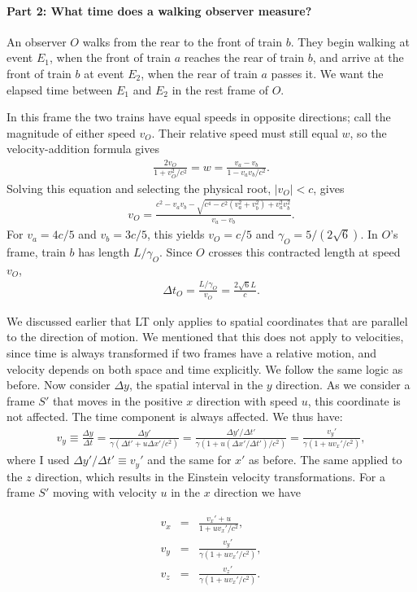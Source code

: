 \documentclass[12pt]{article}
\newcommand{\be}{\begin{eqnarray}}
\newcommand{\ee}{\end{eqnarray}}
\begin{document}
\paragraph{Part 2: What time does a walking observer measure?}
An observer $O$ walks from the rear to the front of train $b$. They begin walking at event $E_1$, when the front of train $a$ reaches the rear of train $b$, and arrive at the front of train $b$ at event $E_2$, when the rear of train $a$ passes it. We want the elapsed time between $E_1$ and $E_2$ in the rest frame of $O$.

In this frame the two trains have equal speeds in opposite directions; call the magnitude of either speed $v_O$. Their relative speed must still equal $w$, so the velocity-addition formula gives
\be
\frac{2v_O}{1+v_O^2/c^2}=w=\frac{v_a-v_b}{1-v_a v_b/c^2}.
\ee
Solving this equation and selecting the physical root, $|v_O|<c$, gives
\be
v_O=\frac{c^2-v_av_b-\sqrt{c^4-c^2(v_a^2+v_b^2)+v_a^2v_b^2}}{v_a-v_b}.
\ee
For $v_a=4c/5$ and $v_b=3c/5$, this yields $v_O=c/5$ and $\gamma_O=5/(2\sqrt{6})$. In $O$'s frame, train $b$ has length $L/\gamma_O$. Since $O$ crosses this contracted length at speed $v_O$,
\be
\Delta t_O=\frac{L/\gamma_O}{v_O}=\frac{2\sqrt{6}L}{c}.
\ee

\noindent
We discussed earlier that LT only applies to spatial coordinates that are parallel to the direction of motion. We mentioned that this does not apply to velocities, since time is always transformed if two frames have a relative motion, and velocity depends on both space and time explicitly. We follow the same logic as before. Now consider $\Delta y$, the spatial interval in the $y$ direction. As we consider a frame $S'$ that moves in the positive $x$ direction with speed $u$, this coordinate is not affected. The time component is always affected. We thus have:
\be
v_y \equiv \frac{\Delta y}{\Delta t} = \frac{\Delta y'}{\gamma(\Delta t' + u \Delta x'/c^2)} = \frac{\Delta y'/\Delta t'}{\gamma(1 + u(\Delta x'/\Delta t')/c^2)} = \frac{v_y'}{\gamma(1+ u v_x'/c^2)},
\ee
where I used $\Delta y'/\Delta t' \equiv v_y'$ and the same for $x'$ as before. The same applied to the $z$ direction, which results in the Einstein velocity transformations. For a frame $S'$ moving with velocity $u$ in the $x$ direction we have
\begin{tcolorbox}[colback=blue!5!white]
\vspace{-1.3em}
\be
v_x &=& \frac{v_x' + u}{1+u v_x'/c^2},\\
v_y &=& \frac{v_y'}{\gamma(1+ u v_x'/c^2)},\\
v_z &=& \frac{v_z'}{\gamma(1+ u v_x'/c^2)}.
\ee
\end{tcolorbox}
\end{document}
